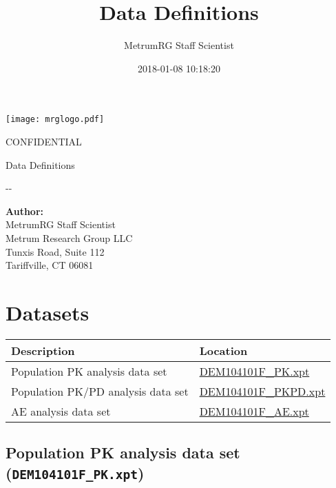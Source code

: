 \documentclass[]{article}
\title{Data Definitions}
\author{MetrumRG Staff Scientist}
\date{2018-01-08 10:18:20}
\newcommand{\todaymetrum}{\the\year-\twodigit{\month}-\twodigit{\day}}
\newcommand{\doctitle}{Data Definitions}
\newcommand{\scientist}{MetrumRG Staff Scientist}
\begin{document}
\begin{center}
\texttt{[image: mrglogo.pdf]}
\vspace{1cm}

{\Large CONFIDENTIAL}
\vspace{3.0cm}

{\huge \doctitle}
\vspace{1cm}

\todaymetrum
\vspace{6cm}

{\large\bfseries Author:}\\
\scientist \\
 Metrum Research Group LLC\\
Tunxis Road, Suite 112\\
Tariffville, CT 06081\\
\end{center}


\newpage



\section{Datasets}\label{datasets}

\begin{tabular}{|p{2.85in}|p{2.55in}|}
\hline
Description & Location\\
\hline
Population PK analysis data set & \hyperref[DEM104101F_PK]{DEM104101F\_PK.xpt}\\
\hline
Population PK/PD analysis data set & \hyperref[DEM104101F_PKPD]{DEM104101F\_PKPD.xpt}\\
\hline
AE analysis data set & \hyperref[DEM104101F_AE]{DEM104101F\_AE.xpt}\\
\hline
\end{tabular}

\subsection{\texorpdfstring{Population PK analysis data set
(\texttt{DEM104101F\_PK.xpt})
\label{DEM104101F_PK}}{Population PK analysis data set (DEM104101F\_PK.xpt) }}\label{population-pk-analysis-data-set-dem104101f_pk.xpt}

\noindent
\end{document}
